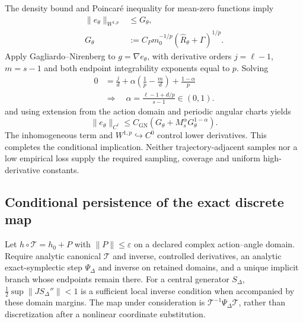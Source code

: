 The density bound and Poincar\'e inequality for mean-zero functions imply
\begin{equation}
 \begin{aligned}
 \|e_\theta\|_{W^{1,p}}&\le G_\theta,\\
 G_\theta&:=C_Pm_0^{-1/p}(\widehat R_\theta+\Gamma)^{1/p}.
 \end{aligned}
 \label{eq:supp-learn-poincare}
\end{equation}
Apply Gagliardo--Nirenberg to $g=\nabla e_\theta$, with derivative orders $j=\ell-1$, $m=s-1$ and both endpoint integrability exponents equal to $p$. Solving
\begin{equation}
 \begin{aligned}
 0&=\frac{j}{d}+\alpha\left(\frac1p-\frac{m}{d}\right)+\frac{1-\alpha}{p}\\
 &\Longrightarrow\quad
 \alpha=\frac{\ell-1+d/p}{s-1}\in(0,1).
 \end{aligned}
 \label{eq:supp-learn-interpolation-exponent}
\end{equation}
and using extension from the action domain and periodic angular charts yields
\begin{equation}
 \|e_\theta\|_{C^\ell}
 \le C_{\mathrm{GN}}\left(G_\theta+M_s^\alpha G_\theta^{1-\alpha}\right).
 \label{eq:supp-learn-interpolation-result}
\end{equation}
The inhomogeneous term and $W^{1,p}\hookrightarrow C^0$ control lower derivatives. This completes the conditional implication. Neither trajectory-adjacent samples nor a low empirical loss supply the required sampling, coverage and uniform high-derivative constants.

\subsection{Conditional persistence of the exact discrete map}
Let $h\circ\mathcal T=h_0+P$ with $\|P\|\le\varepsilon$ on a declared complex action--angle domain. Require analytic canonical $\mathcal T$ and inverse, controlled derivatives, an analytic exact-symplectic step $\Psi_\Delta$ and inverse on retained domains, and a unique implicit branch whose endpoints remain there. For a central generator $S_\Delta$, $\tfrac12\sup\|JS_\Delta''\|<1$ is a sufficient local inverse condition when accompanied by these domain margins. The map under consideration is $\mathcal T^{-1}\Psi_\Delta\mathcal T$, rather than discretization after a nonlinear coordinate substitution.

